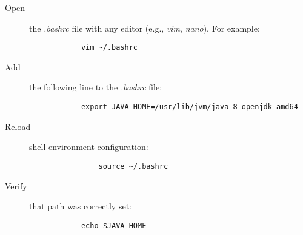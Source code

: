 \documentclass{article}
\begin{document}
        \begin{description}

            \item[Open] the \emph{.bashrc} file with any editor (e.g., \emph{vim}, \emph{nano}).
            For example:
            \begin{verbatim}
            vim ~/.bashrc
            \end{verbatim}

            \item[Add] the following line to the \emph{.bashrc} file:
            \begin{verbatim}
            export JAVA_HOME=/usr/lib/jvm/java-8-openjdk-amd64                 
            \end{verbatim}
            
            \item[Reload] shell environment configuration:
            \begin{verbatim}
                source ~/.bashrc
            \end{verbatim}

            \item[Verify] that path was correctly set:
            \begin{verbatim}
            echo $JAVA_HOME
            \end{verbatim}
        \end{description}
\end{document}
